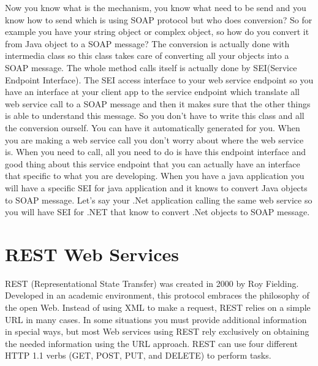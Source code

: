 Now you know what is the mechanism, you know what need to be send and you know how to send which is using SOAP protocol but who does conversion? So for example you have your string object or complex object, so how do you convert it from Java object to a SOAP message? The conversion is actually done with intermedia class so this class takes care of converting all your objects into a SOAP message. The whole method calls itself is actually done by SEI(Service Endpoint Interface)\citep{thesis:state5}. The SEI access interface to your web service endpoint so you have an interface at your client app to the service endpoint which translate all web service call to a SOAP message and then it makes sure that the other things is able to understand this message. So you don’t have to write this class and all the conversion ourself. You can have it automatically generated for you. When you are making a web service call you don’t worry about where the web service is. When you need to call, all you need to do is have this endpoint interface and good thing about this service endpoint that you can actually have an interface that specific to what you are developing. When you have a java application you will have a specific SEI for java application and it knows to convert Java objects to SOAP message. Let’s say your .Net application calling the same web service so you will have SEI for .NET that know to convert .Net objects to SOAP message.

\section{REST Web Services}
\label{section:rest}
REST (Representational State Transfer) was created in 2000 by Roy Fielding\citep{thesis:state5_1}. Developed in an academic environment, this protocol embraces the philosophy of the open Web. Instead of using XML to make a request, REST relies on a simple URL in many cases. In some situations you must provide additional information in special ways, but most Web services using REST rely exclusively on obtaining the needed information using the URL approach. REST can use four different HTTP 1.1 verbs (GET, POST, PUT, and DELETE) to perform tasks.

